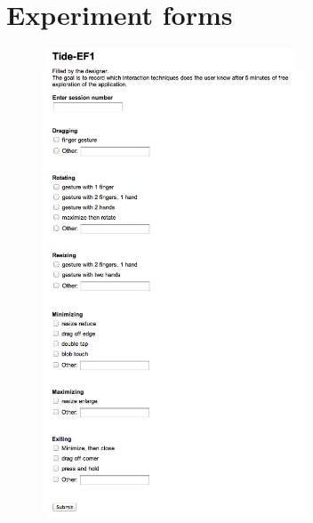 \clearpage
\section{Experiment forms}
\label{app:evalforms}

\begin{figure}[htb]
  \centering
    \includegraphics[width=0.7\textwidth]{images/evalform1}
\end{figure}

